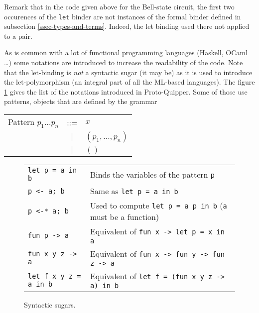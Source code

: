 Remark that in the code given above for the Bell-state circuit, 
the first two occurences of the \verb#let# binder are not 
instances of the formal binder defined in subsection 
\hyperref[ssec-types-and-terms]{\ref*{ssec-types-and-terms}}. 
Indeed, the let binding used there not applied to a pair. 


As is common with a lot of functional programming languages 
(Haskell, OCaml \ldots) some notations are introduced to increase
the readability of the code. Note that the let-binding is \emph{not} a syntactic sugar (it may be) as it is used to introduce
the let-polymorphism (an integral part of all the ML-based languages).
The figure \ref{sugar} gives the list of the notations introduced in Proto-Quipper. Some of those use patterns, objects that are
defined by the grammar
	\begin{center}
	\begin{tabular}{rcl}
		Pattern $p_1 \dots p_n$ & ::= & $x$ \\
		            & $|$ & $(p_1, \dots, p_n)$ \\
		            & $|$ & $()$
	\end{tabular}
	\end{center}

\begin{figure}[!ht]
\begin{tabular}{ll}
  \verb#let p = a in b#       & Binds the variables of the pattern 
                                \verb#p# \\
  \verb#p <- a; b#            & Same as \verb#let p = a in b# \\
  \verb#p <-* a; b#           & Used to compute \verb#let p = a p in b#
                                (\verb#a# must be a function)\\
  \verb#fun p -> a#           & Equivalent of 
                                \verb#fun x -> let p = x in a# \\
  \verb#fun x y z -> a#       & Equivalent of 
                                \verb#fun x -> fun y -> fun z -> a# \\
  \verb#let f x y z = a in b# & Equivalent of 
                                \verb#let f = (fun x y z -> a) in b#
\end{tabular}
\label{sugar}
\caption{Syntactic sugars.}
\end{figure}

